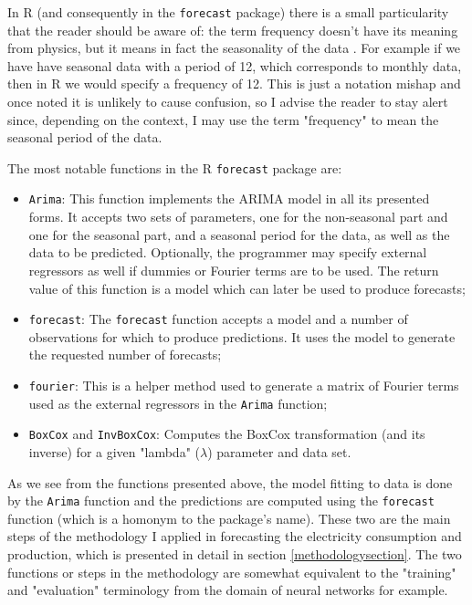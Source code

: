 \documentclass[12pt,a4paper,titlepage]{report}
\begin{document}
In R (and consequently in the \texttt{forecast} package) there is a small particularity that the reader should be aware of: the term frequency doesn't have its meaning from physics, but it means in fact the seasonality of the data \cite{hyndmanseasonalperiods}.
For example if we have have seasonal data with a period of 12, which corresponds to monthly data, then in R we would specify a frequency of 12.
This is just a notation mishap and once noted it is unlikely to cause confusion, so I advise the reader to stay alert since, depending on the context, I may use the term "frequency" to mean the seasonal period of the data.

The most notable functions in the R \texttt{forecast} package are:
\begin{itemize}
    \item \texttt{Arima}: This function implements the ARIMA model in all its presented forms. It accepts two sets of parameters, one for the non-seasonal part and one for the seasonal part, and a seasonal period for the data, as well as the data to be predicted. Optionally, the programmer may specify external regressors as well if dummies or Fourier terms are to be used. The return value of this function is a model which can later be used to produce forecasts;
    \item \texttt{forecast}: The \texttt{forecast} function accepts a model and a number of observations for which to produce predictions. It uses the model to generate the requested number of forecasts;
    \item \texttt{fourier}: This is a helper method used to generate a matrix of Fourier terms used as the external regressors in the \texttt{Arima} function;
    \item \texttt{BoxCox} and \texttt{InvBoxCox}: Computes the BoxCox transformation (and its inverse) for a given "lambda" ($ \lambda $) parameter and data set.
\end{itemize}

As we see from the functions presented above, the model fitting to data is done by the \texttt{Arima} function and the predictions are computed using the \texttt{forecast} function (which is a homonym to the package's name). These two are the main steps of the methodology I applied in forecasting the electricity consumption and production, which is presented in detail in section \ref{methodologysection}. The two functions or steps in the methodology are somewhat equivalent to the "training" and "evaluation" terminology from the domain of neural networks for example.
\end{document}
